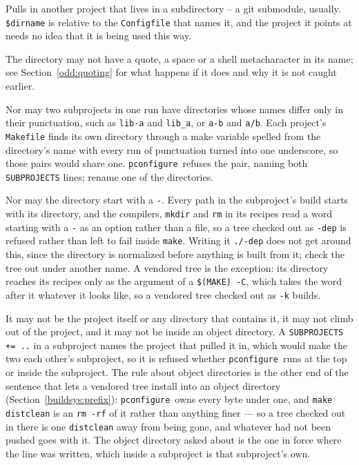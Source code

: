 \documentclass{article}
\newcommand{\pconfigure}{\texttt{pconfigure}}
\begin{document}
Pulls in another project that lives in a subdirectory -- a git
submodule, usually.  \texttt{\$dirname} is relative to the
\texttt{Configfile} that names it, and the project it points at needs
no idea that it is being used this way.

The directory may not have a quote, a space or a shell
metacharacter in its name; see Section~\ref{odd:quoting} for
what happens if it does and why it is not caught earlier.

Nor may two subprojects in one run have directories whose names differ
only in their punctuation, such as \texttt{lib-a} and \texttt{lib\_a},
or \texttt{a-b} and \texttt{a/b}.  Each project's \texttt{Makefile}
finds its own directory through a make variable spelled from the
directory's name with every run of punctuation turned into one
underscore, so those pairs would share one.  \pconfigure\ refuses
the pair, naming both \texttt{SUBPROJECTS} lines; rename one of the
directories.

Nor may the directory start with a \texttt{-}.  Every path in the
subproject's build starts with its directory, and the compilers,
\texttt{mkdir} and \texttt{rm} in its recipes read a word starting
with a \texttt{-} as an option rather than a file, so a tree checked
out as \texttt{-dep} is refused rather than left to fail inside
\texttt{make}.  Writing it \texttt{./-dep} does not get around this,
since the directory is normalized before anything is built from it;
check the tree out under another name.
A vendored tree is the exception: its directory reaches its recipes
only as the argument of a \texttt{\$(MAKE) -C}, which takes the word
after it whatever it looks like, so a vendored tree checked out as
\texttt{-k} builds.

It may not be the project itself or any directory that contains it,
it may not climb out of the project, and it may not be inside an object
directory.  A \texttt{SUBPROJECTS += ..} in a subproject names the
project that pulled it in, which would make the two each other's
subproject, so it is refused whether \pconfigure\ runs at the top or
inside the subproject.  The rule about object directories is the
other end of the sentence that lets a vendored tree install into
an object directory (Section~\ref{buildsys:prefix}): \pconfigure\
owns every byte under one, and \texttt{make distclean} is an
\texttt{rm -rf} of it rather than anything finer --- so a tree
checked out in there is one \texttt{distclean} away from being gone,
and whatever had not been pushed goes with it.  The object directory
asked about is the one in force where the line was written, which
inside a subproject is that subproject's own.
\end{document}
